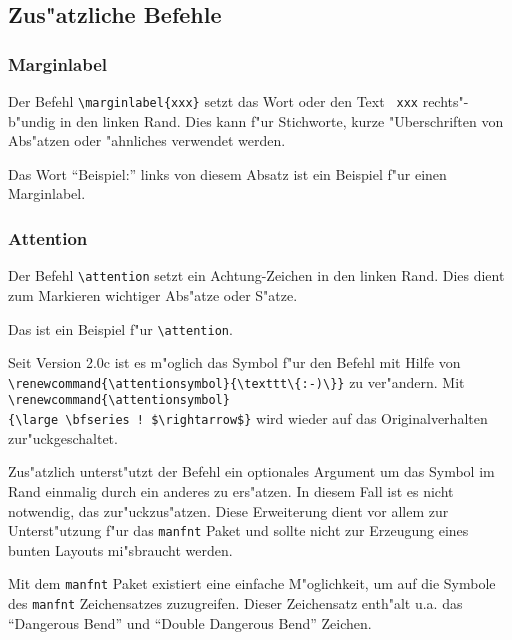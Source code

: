 \subsection{Zus"atzliche Befehle}

\subsubsection{Marginlabel}

Der Befehl \verb|\marginlabel{xxx}| setzt das Wort oder den Text {\tt 
xxx} rechts"-b"undig in den linken Rand. Dies kann f"ur Stichworte, 
kurze "Uberschriften von Abs"atzen oder "ahnliches verwendet werden.

Das Wort "`Beispiel:"' links von diesem 
Absatz ist ein Beispiel f"ur einen Marginlabel.

\subsubsection{Attention}

Der Befehl \verb|\attention| setzt ein Achtung-Zeichen in den linken 
Rand. Dies dient zum Markieren wichtiger Abs"atze oder S"atze.

\attention
Das ist ein Beispiel f"ur \verb|\attention|.

\renewcommand{\attentionsymbol}{\texttt{:-)}}
\attention
Seit Version 2.0c ist es m"oglich das Symbol f"ur den 
 Befehl mit Hilfe von 
\verb|\renewcommand{\attentionsymbol}{\texttt\{:-)\}}|
zu ver"andern. Mit 
\verb|\renewcommand{\attentionsymbol}|\\ \verb|{\large \bfseries ! $\rightarrow$}|
\renewcommand{\attentionsymbol}{\large \bfseries ! $\rightarrow$} 
wird wieder auf das Originalverhalten zur"uckgeschaltet.

Zus"atzlich unterst"utzt der  Befehl ein optionales 
Argument um das Symbol im Rand einmalig durch ein anderes zu ers"atzen.
In diesem Fall ist es nicht notwendig, das  
zur"uckzus"atzen. Diese Erweiterung dient vor allem zur 
Unterst"utzung f"ur das \texttt{manfnt} Paket und sollte nicht zur 
Erzeugung eines bunten Layouts mi"sbraucht werden.\attention[\texttt{:-(}]

Mit dem \texttt{manfnt} Paket existiert eine einfache M"oglichkeit, um auf 
die Symbole des \texttt{manfnt} Zeichensatzes zuzugreifen. Dieser 
Zeichensatz enth"alt u.a. das "`Dangerous Bend"' und "`Double 
Dangerous Bend"' Zeichen.

